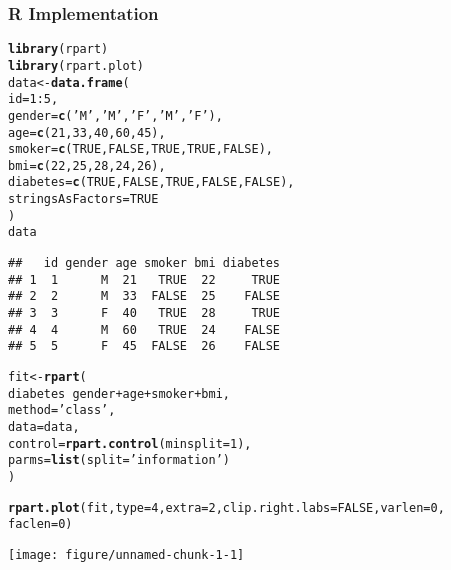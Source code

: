 \documentclass[../../dsa1101_notes.Rtex]{subfiles}\usepackage[]{graphicx}\usepackage[]{color}
\makeatletter
\def\maxwidth{ %
  \ifdim\Gin@nat@width>\linewidth
    \linewidth
  \else
    \Gin@nat@width
  \fi
}
\newcommand{\hlnum}[1]{\textcolor[rgb]{0.686,0.059,0.569}{#1}}%
\newcommand{\hlstr}[1]{\textcolor[rgb]{0.192,0.494,0.8}{#1}}%
\newcommand{\hlopt}[1]{\textcolor[rgb]{0,0,0}{#1}}%
\newcommand{\hlstd}[1]{\textcolor[rgb]{0.345,0.345,0.345}{#1}}%
\newcommand{\hlkwb}[1]{\textcolor[rgb]{0.69,0.353,0.396}{#1}}%
\newcommand{\hlkwc}[1]{\textcolor[rgb]{0.333,0.667,0.333}{#1}}%
\newcommand{\hlkwd}[1]{\textcolor[rgb]{0.737,0.353,0.396}{\textbf{#1}}}%
\newenvironment{kframe}{%
 \def\at@end@of@kframe{}%
 \ifinner\ifhmode%
  \def\at@end@of@kframe{\end{minipage}}%
  \begin{minipage}{\columnwidth}%
 \fi\fi%
 \def\FrameCommand##1{\hskip\@totalleftmargin \hskip-\fboxsep
 \colorbox{shadecolor}{##1}\hskip-\fboxsep
     \hskip-\linewidth \hskip-\@totalleftmargin \hskip\columnwidth}%
 \MakeFramed {\advance\hsize-\width
   \@totalleftmargin\z@ \linewidth\hsize
   \@setminipage}}%
 {\par\unskip\endMakeFramed%
 \at@end@of@kframe}
\newenvironment{knitrout}{}{} %
\makeatother
\begin{document}
\subsubsection{R Implementation}
\begin{knitrout}
\color{fgcolor}\begin{kframe}
\begin{alltt}
\hlkwd{library}\hlstd{(rpart)}
\hlkwd{library}\hlstd{(rpart.plot)}
\hlstd{data} \hlkwb{<-} \hlkwd{data.frame}\hlstd{(}
  \hlkwc{id} \hlstd{=} \hlnum{1}\hlopt{:}\hlnum{5}\hlstd{,}
  \hlkwc{gender} \hlstd{=} \hlkwd{c}\hlstd{(}\hlstr{'M'}\hlstd{,} \hlstr{'M'}\hlstd{,} \hlstr{'F'}\hlstd{,} \hlstr{'M'}\hlstd{,} \hlstr{'F'}\hlstd{),}
  \hlkwc{age} \hlstd{=} \hlkwd{c}\hlstd{(}\hlnum{21}\hlstd{,} \hlnum{33}\hlstd{,} \hlnum{40}\hlstd{,} \hlnum{60}\hlstd{,} \hlnum{45}\hlstd{),}
  \hlkwc{smoker} \hlstd{=} \hlkwd{c}\hlstd{(}\hlnum{TRUE}\hlstd{,} \hlnum{FALSE}\hlstd{,} \hlnum{TRUE}\hlstd{,} \hlnum{TRUE}\hlstd{,} \hlnum{FALSE}\hlstd{),}
  \hlkwc{bmi} \hlstd{=} \hlkwd{c}\hlstd{(}\hlnum{22}\hlstd{,} \hlnum{25}\hlstd{,} \hlnum{28}\hlstd{,} \hlnum{24}\hlstd{,} \hlnum{26}\hlstd{),}
  \hlkwc{diabetes} \hlstd{=} \hlkwd{c}\hlstd{(}\hlnum{TRUE}\hlstd{,} \hlnum{FALSE}\hlstd{,} \hlnum{TRUE}\hlstd{,} \hlnum{FALSE}\hlstd{,} \hlnum{FALSE}\hlstd{),}
  \hlkwc{stringsAsFactors} \hlstd{=} \hlnum{TRUE}
\hlstd{)}
\hlstd{data}
\end{alltt}
\begin{verbatim}
##   id gender age smoker bmi diabetes
## 1  1      M  21   TRUE  22     TRUE
## 2  2      M  33  FALSE  25    FALSE
## 3  3      F  40   TRUE  28     TRUE
## 4  4      M  60   TRUE  24    FALSE
## 5  5      F  45  FALSE  26    FALSE
\end{verbatim}
\begin{alltt}
\hlstd{fit} \hlkwb{<-} \hlkwd{rpart}\hlstd{(}
  \hlstd{diabetes} \hlopt{~} \hlstd{gender} \hlopt{+} \hlstd{age} \hlopt{+} \hlstd{smoker} \hlopt{+} \hlstd{bmi,}
  \hlkwc{method} \hlstd{=} \hlstr{'class'}\hlstd{,}
  \hlkwc{data} \hlstd{= data,}
  \hlkwc{control} \hlstd{=} \hlkwd{rpart.control}\hlstd{(}\hlkwc{minsplit}\hlstd{=}\hlnum{1}\hlstd{),}
  \hlkwc{parms} \hlstd{=} \hlkwd{list}\hlstd{(}\hlkwc{split} \hlstd{=} \hlstr{'information'}\hlstd{)}
\hlstd{)}

\hlkwd{rpart.plot}\hlstd{(fit,} \hlkwc{type} \hlstd{=} \hlnum{4}\hlstd{,} \hlkwc{extra} \hlstd{=} \hlnum{2}\hlstd{,} \hlkwc{clip.right.labs} \hlstd{=} \hlnum{FALSE}\hlstd{,} \hlkwc{varlen} \hlstd{=} \hlnum{0}\hlstd{,}
           \hlkwc{faclen} \hlstd{=} \hlnum{0}\hlstd{)}
\end{alltt}
\end{kframe}
\texttt{[image: figure/unnamed-chunk-1-1]} 
\end{knitrout}
\end{document}
